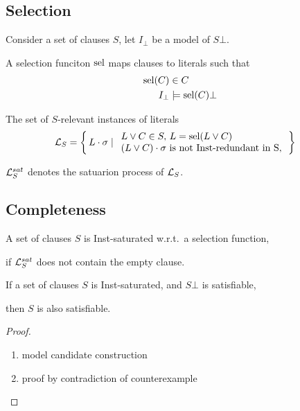 \documentclass[%
handout,
]{beamer}
\begin{document}
\subsection{Selection}
\begin{frame}
    Consider a set of clauses $S$, let $I_\bot$ be a model of $S\bot$.

    A selection funciton $\operatorname{sel}$ maps clauses to literals such that
    \begin{align*}
        \operatorname{sel}(C)&\in C
        \\
        I_\bot&\models\operatorname{sel}(C)\bot
    \end{align*}
    
    

    The set of $S$-relevant instances of literals
    \begin{align*}
        \mathcal{L}_S &= \left\{\, L\cdot\sigma \mid
        \begin{array}{l}
            L\lor C\in S,\,L = \operatorname{sel}(L\lor C)\\
            (L\lor C)\cdot\sigma\text{ is not Inst-redundant in S},\\
        \end{array}
        \,\right\}
    \end{align*}

    \vspace{1.4em}
    $\mathcal{L}_S^{sat}$ denotes the satuarion process of $\mathcal{L}_S$.

    \vspace{0.7em}
    

\end{frame}

\subsection{Completeness}
\begin{frame}
    A set of clauses $S$ is Inst-saturated w.r.t.~a selection function,

    if $\mathcal{L}_S^{sat}$ does not contain the empty clause.
    \vspace{1.4em}

    \begin{theorem}
    If a set of clauses $S$ is Inst-saturated, 
    and $S\bot$ is satisfiable,

    then $S$ is also satisfiable.
    \end{theorem}
    \vspace{1.4em}

    \begin{proof}
        \begin{enumerate}
            \item model candidate construction
            \item proof by contradiction of counterexample 
        \end{enumerate}
        \end{proof}
\end{frame}
\end{document}
